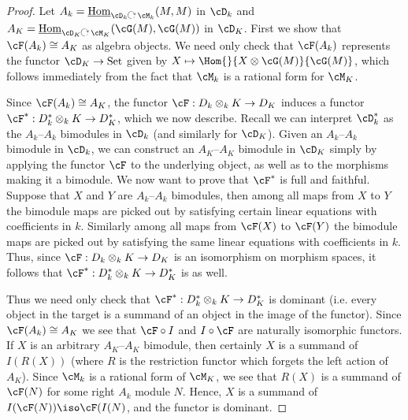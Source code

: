 \begin{proof}
Let $A_k = \iHom_{\cD_k \actson \cM_k}(M,M)$ in $\cD_k$ and $A_K =\iHom_{\cD_K \actson \cM_K}(\cG(M),\cG(M))$ in $\cD_K$.  First we show that $\cF(A_k) \cong A_K$ as algebra objects.  We need only check that $\cF(A_k)$ represents the functor  $\cD_K \to \mathrm{Set}$ given by $X \mapsto \Hom{}{X \otimes \cG(M)}{\cG(M)}$, which follows immediately from the fact that $\cM_k$ is a rational form for $\cM_K$.

Since $\cF(A_k) \cong A_K$, the functor $\cF: D_k \otimes_k K \rightarrow D_K$ induces a functor $\cF^*: D_k^* \otimes_k K \rightarrow D_K^*$, which we now describe.  Recall we can interpret $\cD^*_k$ as the $A_k$--$A_k$ bimodules in $\cD_k$ (and similarly for $\cD_K$). Given an $A_k$--$A_k$ bimodule in $\cD_k$, we can construct an $A_K$--$A_K$ bimodule in $\cD_K$ simply by applying the functor $\cF$ to the underlying object, as well as to the morphisms making it a bimodule. We now want to prove that $\cF^*$ is full and faithful.  Suppose that $X$ and $Y$ are $A_k$--$A_k$ bimodules, then among all maps from $X$ to $Y$ the bimodule maps are picked out by satisfying certain linear equations with coefficients in $k$.  Similarly among all maps from $\cF(X)$ to $\cF(Y)$ the bimodule maps are picked out by satisfying the same linear equations with coefficients in $k$.  Thus, since $\cF: D_k \otimes_k K \rightarrow D_K$ is an isomorphism on morphism spaces, it follows that $\cF^*: D_k^* \otimes_k K \rightarrow D_K^*$ is as well.

Thus we need only check that $\cF^*: D_k^* \otimes_k K \rightarrow D_K^*$ is dominant (i.e. every object in the target is a summand of an object in the image of the functor).  Since $\cF(A_k) \cong A_K$ we see that $\cF \circ I$ and $I \circ \cF$ are naturally isomorphic functors. If  $X$ is an arbitrary $A_K$--$A_K$ bimodule, then certainly $X$ is a summand of $I(R(X))$ (where $R$ is the restriction functor which forgets the left action of $A_K$).  Since $\cM_k$ is a rational form of $\cM_K$, we see that $R(X)$ is a summand of $\cF(N)$ for some right $A_k$ module $N$.  Hence, $X$ is a summand of $I( \cF(N)) \iso \cF(I(N)$, and the functor is dominant.

\end{proof}

